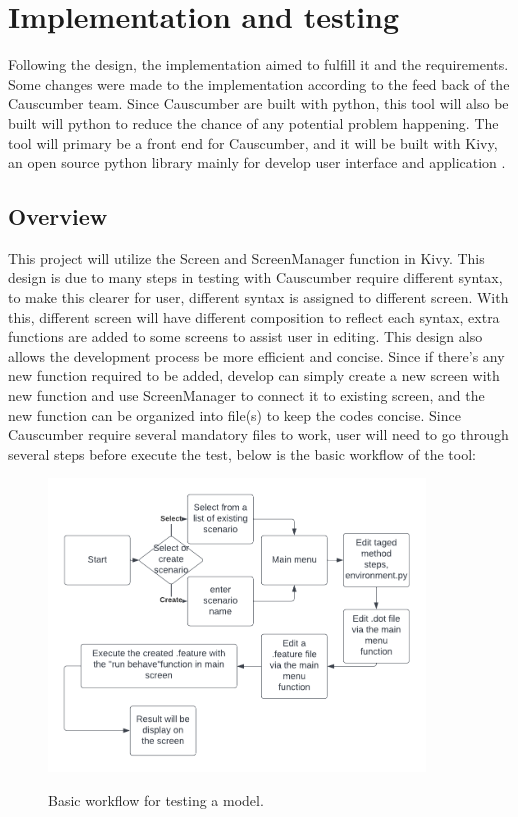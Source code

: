 \chapter{Implementation and testing}
Following the design, the implementation aimed to fulfill it and the requirements. Some changes were made to the implementation according to the feed back of the Causcumber team. Since Causcumber are built with python, this tool will also be built will python to reduce the chance of any potential problem happening. The tool will primary be a front end for Causcumber, and it will be built with Kivy, an open source python library mainly for develop user interface and application \cite{Reference20}. 

\section{Overview}
This project will utilize the Screen and ScreenManager function in Kivy. This design is due to many steps in testing with Causcumber require different syntax, to make this clearer for user, different syntax is assigned to different screen. With this, different screen will have different composition to reflect each syntax, extra functions are added to some screens to assist user in editing. This design also allows the development process be more efficient and concise. Since if there’s any new function required to be added, develop can simply create a new screen with new function and use ScreenManager to connect it to existing screen, and the new function can be organized into file(s) to keep the codes concise. Since Causcumber require several mandatory files to work, user will need to go through several steps before execute the test, below is the basic workflow of the tool:
\begin{figure}[H]
	\centering
	\includegraphics[width=10cm]{figures/workFlow.png}\\
	\caption{Basic workflow for testing a model.}
	\label{fig:figure9}
\end{figure}


